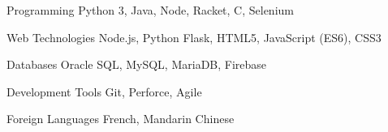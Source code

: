 

\begin{cvskills}

  \cvskill
  {Programming} %
  {Python 3, Java, Node, Racket, C, Selenium} %

  \cvskill
  {Web Technologies} %
  {Node.js, Python Flask, HTML5, JavaScript (ES6), CSS3} %

  \cvskill
  {Databases} %
  {Oracle SQL, MySQL, MariaDB, Firebase} %

  \cvskill
  {Development Tools} %
  {Git, Perforce, Agile} %

  \cvskill
  {Foreign Languages} %
  {French, Mandarin Chinese} %

\end{cvskills}
